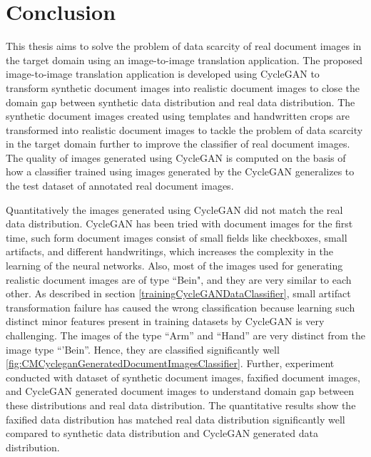\section{Conclusion}\label{Conclusion}

This thesis aims to solve the problem of data scarcity of real document images in the target domain using an image-to-image translation application. The proposed image-to-image translation application is developed using \ac{CycleGAN} to transform synthetic document images into realistic document images to close the domain gap between synthetic data distribution and real data distribution. The synthetic document images created using templates and handwritten crops are transformed into realistic document images to tackle the problem of data scarcity in the target domain further to improve the classifier of real document images. The quality of images generated using \ac{CycleGAN} is computed on the basis of how a classifier trained using images generated by the \ac{CycleGAN} generalizes to the test dataset of annotated real document images. 

Quantitatively the images generated using \ac{CycleGAN} did not match the real data distribution. \ac{CycleGAN} has been tried with document images for the first time, such form document images consist of small fields like checkboxes, small artifacts, and different handwritings, which increases the complexity in the learning of the neural networks. Also, most of the images used for generating realistic document images are of type ``Bein", and they are very similar to each other. As described in section \ref{trainingCycleGANDataClassifier}, small artifact transformation failure has caused the wrong classification because learning such distinct minor features present in training datasets by \ac{CycleGAN} is very challenging. The images of the type ``Arm'' and ``Hand'' are very distinct from the image type ``'Bein''. Hence, they are classified significantly well \ref{fig:CMCycleganGeneratedDocumentImagesClassifier}. Further, experiment conducted with dataset of synthetic document images, faxified document images, and \ac{CycleGAN} generated document images to understand domain gap between these distributions and real data distribution. The quantitative results show the faxified data distribution has matched real data distribution significantly well compared to synthetic data distribution and \ac{CycleGAN} generated data distribution. 


